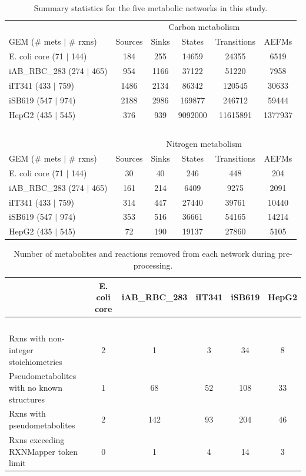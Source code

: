 \documentclass[12pt]{article}
\begin{document}

\begin{table}
\caption{Summary statistics for the five metabolic networks in this study.}
~\\
\begin{tabular}{l|ccccc}
& \multicolumn{5}{c}{{Carbon metabolism}} \\
{GEM (\# mets $|$ \# rxns)} & {Sources} & {Sinks} & {States} & {Transitions} & {AEFMs} \\ \hline
E. coli core (71 $|$ 144) & 184 & 255 & 14659 & 24355 & 6519 \\
iAB\_RBC\_283	 (274 $|$ 465) & 954 & 1166 & 37122 & 51220 & 7958 \\
iIT341 (433 $|$ 759) & 1486 & 2134 & 86342 & 120545 & 30633 \\
iSB619 (547 $|$ 974) & 2188 & 2986 & 169877 & 246712 & 59444 \\
HepG2 (435 $|$ 545) & 376 & 939 & 9092000 & 11615891 & 1377937\\ 
~\\
& \multicolumn{5}{c}{{Nitrogen metabolism}} \\
{GEM (\# mets $|$ \# rxns)} & {Sources} & {Sinks} & {States} & {Transitions} & {AEFMs} \\ \hline
E. coli core (71 $|$ 144) & 30 & 40 & 246 & 448 & 204 \\
iAB\_RBC\_283	 (274 $|$ 465) & 161 & 214 & 6409 & 9275 & 2091\\
iIT341 (433 $|$ 759) & 314 & 447 & 27440 & 39761 & 10440 \\
iSB619 (547 $|$ 974) & 353 & 516 & 36661 & 54165 & 14214 \\
HepG2 (435 $|$ 545) & 72 & 190 & 19137 & 27860 & 5105 \\
\end{tabular}
\end{table}

\begin{table}
\caption{Number of metabolites and reactions removed from each network during pre-processing.}
\begin{tabular}{l|ccccc}
 & {E. coli core} & {iAB\_RBC\_283} & {iIT341} & {iSB619} & {HepG2} \\ \hline
 ~\vspace{-1ex}\\
{\small Rxns with non-integer stoichiometries} & 2 & 1 & 3 & 34 & 8 \\
{\small Pseudometabolites with no known structures} & 1 & 68 & 52 & 108 & 33 \\
{\small Rxns with pseudometabolites} & 2 & 142 & 93 & 204 & 46 \\
{\small Rxns exceeding RXNMapper token limit} & 0 & 1 & 4 & 14 & 3 
\end{tabular}
\end{table}
\end{document}
